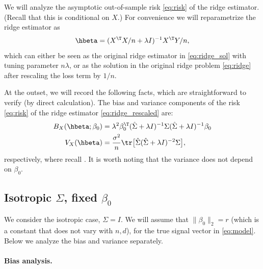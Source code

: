 \documentclass{article}
\begin{document}
We will analyze the asymptotic out-of-sample risk \eqref{eq:risk} of the ridge
estimator. (Recall that this is conditional on $X$.) For convenience we will
reparametrize the ridge estimator as    
\begin{equation}
\label{eq:ridge_rescaled}
\hbeta = (X^\T X/n + \lambda I)^{-1} X^\T Y/n,
\end{equation}
which can either be seen as the original ridge estimator in \eqref{eq:ridge_sol} 
with tuning parameter $n\lambda$, or as the solution in the original ridge
problem \eqref{eq:ridge} after rescaling the loss term by $1/n$.  

At the outset, we will record the following facts, which are straightforward to
verify (by direct calculation). The bias and variance components of the risk
\eqref{eq:risk} of the ridge estimator \eqref{eq:ridge_rescaled} are:      
\begin{align}
\label{eq:ridge_bias}
B_X(\hbeta; \beta_0) &= \lambda^2 \beta_0^\T (\hSigma + \lambda I)^{-1}
  \Sigma (\hSigma + \lambda I)^{-1} \beta_0 \\ 
\label{eq:ridge_var}
V_X(\hbeta) &= \frac{\sigma^2}{n} \tr \big[ \hSigma ( \hSigma + \lambda
  I)^{-2} \Sigma \big],
\end{align}
respectively, where recall . It is worth noting that
the variance does not depend on $\beta_0$. 

\subsection{Isotropic $\Sigma$, fixed $\beta_0$}

We consider the isotropic case, $\Sigma = I$. We will assume that $\|\beta_0\|_2
= r$ (which is a constant that does not vary with $n,d$), for the true signal
vector in \eqref{eq:model}. Below we analyze the bias and variance separately. 

\paragraph{Bias analysis.}
\end{document}
